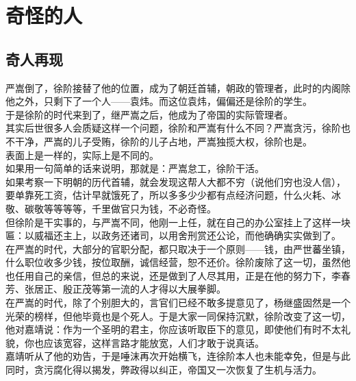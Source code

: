 \section{奇怪的人}
\ifnum{}
	\begin{multicols}{\theparacolNo}
\fi
\subsection{奇人再现}
严嵩倒了，徐阶接替了他的位置，成为了朝廷首辅，朝政的管理者，此时的内阁除他之外，只剩下了一个人——袁炜。而这位袁炜，偏偏还是徐阶的学生。\\

于是徐阶的时代来到了，继严嵩之后，他成为了帝国的实际管理者。\\

其实后世很多人会质疑这样一个问题，徐阶和严嵩有什么不同？严嵩贪污，徐阶也不干净，严嵩的儿子受贿，徐阶的儿子占地，严嵩独揽大权，徐阶也是。\\

表面上是一样的，实际上是不同的。\\

如果用一句简单的话来说明，那就是：严嵩怠工，徐阶干活。\\

如果考察一下明朝的历代首辅，就会发现这帮人大都不穷（说他们穷也没人信），要单靠死工资，估计早就饿死了，所以多多少少都有点经济问题，什么火耗、冰敬、碳敬等等等等，千里做官只为钱，不必奇怪。\\

但徐阶是干实事的，与严嵩不同，他刚一上任，就在自己的办公室挂上了这样一块匾：以威福还主上，以政务还诸司，以用舍刑赏还公论，而他确确实实做到了。\\

在严嵩的时代，大部分的官职分配，都只取决于一个原则——钱，由严世蕃坐镇，什么职位收多少钱，按位取酬，诚信经营，恕不还价。徐阶废除了这一切，虽然他也任用自己的亲信，但总的来说，还是做到了人尽其用，正是在他的努力下，李春芳、张居正、殷正茂等第一流的人才得以大展拳脚。\\

在严嵩的时代，除了个别胆大的，言官们已经不敢多提意见了，杨继盛固然是一个光荣的榜样，但他毕竟也是个死人。于是大家一同保持沉默，徐阶改变了这一切，他对嘉靖说：作为一个圣明的君主，你应该听取臣下的意见，即使他们有时不太礼貌，你也应该宽容，这样言路才能放宽，人们才敢于说真话。\\

嘉靖听从了他的劝告，于是唾沫再次开始横飞，连徐阶本人也未能幸免，但是与此同时，贪污腐化得以揭发，弊政得以纠正，帝国又一次恢复了生机与活力。\\


\end{multicols}

